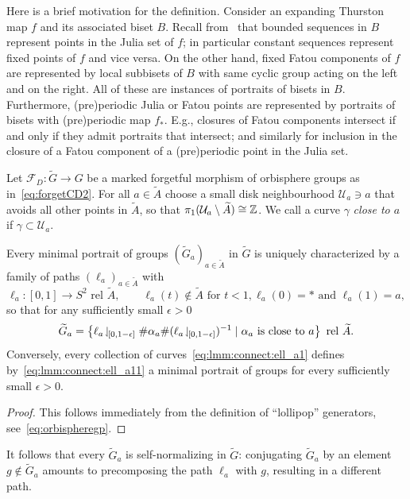 \documentclass{amsart}
\newcommand\Forget{{\mathcal F}}
\newcommand\wtA{{\widetilde A}}
\newcommand\wtG{{\widetilde G}}
\begin{document}
Here is a brief motivation for the definition. Consider an expanding
Thurston map $f$ and its associated biset $B$. Recall
from~\cite{nekrashevych:ssg} that bounded sequences in $B$ represent
points in the Julia set of $f$; in particular constant sequences
represent fixed points of $f$ and vice versa. On the other hand, fixed
Fatou components of $f$ are represented by local subbisets of $B$ with
same cyclic group acting on the left and on the right. All of these
are instances of portraits of bisets in $B$. Furthermore,
(pre)periodic Julia or Fatou points are represented by portraits of
bisets with (pre)periodic map $f_*$. E.g., closures of Fatou
components intersect if and only if they admit portraits that
intersect; and similarly for inclusion in the closure of a Fatou
component of a (pre)periodic point in the Julia set.

Let $\Forget_D\colon\wtG\to G$ be a marked forgetful morphism
of orbisphere groups as in~\eqref{eq:forgetCD2}. For all $a\in\wtA$
choose a small disk neighbourhood $\mathcal U_a\ni a$ that avoids all
other points in $\wtA$, so that
$\pi_1(\mathcal U_a\setminus\wtA)\cong\Z$. We call a curve
$\gamma$ \emph{close to $a$} if $\gamma\subset\mathcal U_a$.

\begin{lem}\label{lmm:connect:ell_a}
  Every minimal portrait of groups
  $(\wtG_a)_{a\in\wtA}$ in $\wtG$ is uniquely
  characterized by a family of paths $(\ell_a)_{a\in\wtA}$
  with
  \begin{equation}\label{eq:lmm:connect:ell_a1}
    \ell_a\colon [0,1]\to S^2\text{ rel }\wtA,\qquad
    \ell_a(t)\notin\wtA \text{ for } t<1, \ell_a(0)=* \text{ and }\ell_a(1)=a,
  \end{equation}
  so that for any sufficiently small $\epsilon>0$
  \begin{equation}\label{eq:lmm:connect:ell_a11}
    \wtG_a= \left\{\ell_a\restrict{[0,1-\epsilon]}\#\alpha_a \#(\ell_{a}\restrict{[0,1-\epsilon]})^{-1}\mid\alpha_a \text{ is close to }a\right\}\text{ rel } \wtA.
  \end{equation}
  Conversely, every collection of curves~\eqref{eq:lmm:connect:ell_a1}
  defines by~\eqref{eq:lmm:connect:ell_a11} a minimal portrait of
  groups for every sufficiently small $\epsilon>0$.
\end{lem}
\begin{proof}
  This follows immediately from the definition of ``lollipop''
  generators, see~\eqref{eq:orbispheregp}.
\end{proof}
It follows that every $\wtG_a$ is self-normalizing in
$\wtG$: conjugating $\wtG_a$ by an element
$g\not\in\wtG_a$ amounts to precomposing the path $\ell_a$
with $g$, resulting in a different path.
\end{document}
